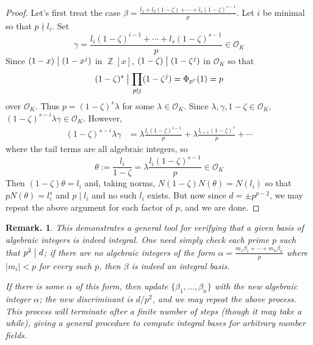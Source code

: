 \documentclass[11pt, a4paper]{memoir}
\DeclareMathOperator{\Z}{{\mathbb{Z}}}
\renewcommand{\div}{\bigm|}
\newcommand{\ndiv}{%
    \mathrel{\mkern.5mu %
        \ooalign{\hidewidth$\big|$\hidewidth\cr$/$\cr}%
    }%
}
\theoremstyle{change}
\theoremstyle{plain}
\theoremstyle{nonumberplain}
\newtheorem{remark}{Remark.}
\newtheorem{proof}{Proof}
\begin{document}
\begin{proof}
    Let's first treat the case $\beta=\frac{l_1+l_2(1-\zeta)+\cdots+l_s(1-\zeta)^{s-1}}{p}$.
    Let $i$ be minimal so that $p\nmid l_i$.
    Set
    \begin{equation*}
        \gamma=\frac{l_i(1-\zeta)^{i-1}+\cdots+l_s(1-\zeta)^{s-1}}{p}\in\mathcal{O}_K
    \end{equation*}
    Since $(1-x)\div(1-x^j)$ in $\Z[x]$, $(1-\zeta)\div(1-\zeta^j)$ in $\mathcal{O}_K$ so that
    \begin{equation*}
        (1-\zeta)^s\div \prod_{p\nmid j}(1-\zeta^j)=\Phi_{p^r}(1)=p
    \end{equation*}
    over $\mathcal{O}_K$.
    Thus $p=(1-\zeta)^s\lambda$ for some $\lambda\in\mathcal{O}_K$.
    Since $\lambda,\gamma,1-\zeta\in\mathcal{O}_K$, $(1-\zeta)^{s-i}\lambda\gamma\in\mathcal{O}_K$.
    However,
    \begin{align*}
        (1-\zeta)^{s-i}\lambda\gamma &= \lambda\frac{l_i(1-\zeta)^{s-1}}{p}+\lambda\frac{l_{i+1}(1-\zeta)^s}{p}+\cdots
    \end{align*}
    where the tail terms are all algebraic integers, so
    \begin{equation*}
        \theta:=\frac{l_i}{1-\zeta}=\lambda\frac{l_i(1-\zeta)^{s-1}}{p}\in\mathcal{O}_K
    \end{equation*}
    Then $(1-\zeta)\theta=l_i$ and, taking norms, $N(1-\zeta)N(\theta)=N(l_i)$ so that $pN(\theta)=l_i^s$ and $p\mid l_i$ and no such $l_i$ exists.
    But now since $d=\pm p^{p-2}$, we may repeat the above argument for each factor of $p$, and we are done.
\end{proof}
\begin{remark}
    This demonstrates a general tool for verifying that a given basis of algebraic integers is indeed integral.
    One need simply check each prime $p$ such that $p^2\div d$; if there are no algebraic integers of the form $\alpha=\frac{m_1\beta_1+\cdots+m_n\beta_n}{p}$ where $|m_i|<p$ for every such $p$, then $\beta$ is indeed an integral basis.

    If there is some $\alpha$ of this form, then update $\{\beta_1,\ldots,\beta_n\}$ with the new algebraic integer $\alpha$; the new discriminant is $d/p^2$, and we may repeat the above process.
    This process will terminate after a finite number of steps (though it may take a while), giving a general procedure to compute integral bases for arbitrary number fields.
\end{remark}
\end{document}
